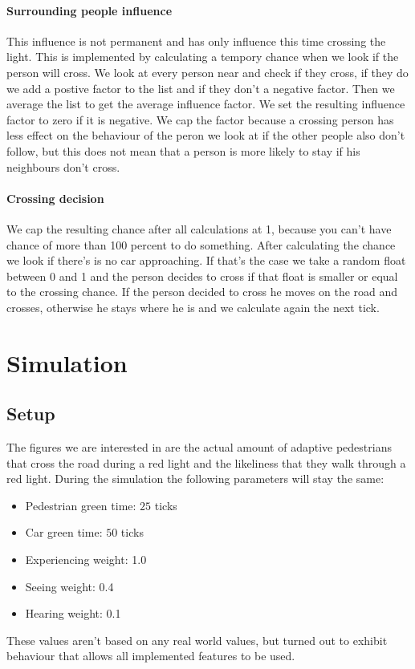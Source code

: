 \documentclass[a4paper]{article}
\begin{document}
\paragraph{Surrounding people influence}
This influence is not permanent and has only influence this time crossing the light. This is implemented by calculating a tempory chance when we look if the person will cross. We look at every person near and check if they cross, if they do we add a postive factor to the list and if they don't a negative factor. Then we average the list to get the average influence factor. We set the resulting influence factor to zero if it is negative. We cap the factor because a crossing person has less effect on the behaviour of the peron we look at if the other people also don't follow, but this does not mean that a person is more likely to stay if his neighbours don't cross.


\paragraph{Crossing decision}
We cap the resulting chance after all calculations at 1, because you can't have chance of more than 100 percent to do something. After calculating the chance we look if there's is no car approaching. If that's the case we take a random float between 0 and 1 and the person decides to cross if that float is smaller or equal to the crossing chance. If the person decided to cross he moves on the road and crosses, otherwise he stays where he is and we calculate again the next tick.

\clearpage

\section{Simulation}
\subsection{Setup}
The figures we are interested in are the actual amount of adaptive pedestrians that cross the road during a red light and the likeliness that they walk through a red light. During the simulation the following parameters will stay the same:
\begin{itemize}
\item Pedestrian green time: $25$ ticks
\item Car green time: $50$ ticks
\item Experiencing weight: 1.0
\item Seeing weight: 0.4
\item Hearing weight: 0.1
\end{itemize}
These values aren't based on any real world values, but turned out to exhibit behaviour that allows all implemented features to be used.
\end{document}
